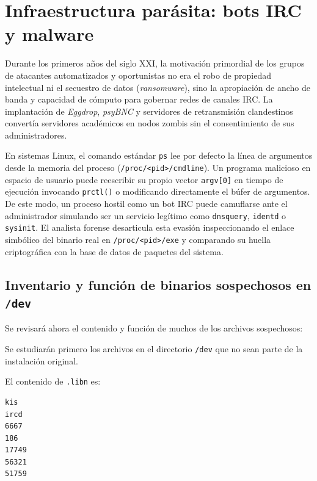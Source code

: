 \chapter{Infraestructura parásita: bots IRC y malware}

Durante los primeros años del siglo XXI, la motivación primordial de los grupos de atacantes automatizados y oportunistas no era el robo de propiedad intelectual ni el secuestro de datos (\textit{ransomware}), sino la apropiación de ancho de banda y capacidad de cómputo para gobernar redes de canales IRC. La implantación de \textit{Eggdrop}, \textit{psyBNC} y servidores de retransmisión clandestinos convertía servidores académicos en nodos zombis sin el consentimiento de sus administradores.

\begin{notaforense}
En sistemas Linux, el comando estándar \texttt{ps} lee por defecto la línea de argumentos desde la memoria del proceso (\texttt{/proc/<pid>/cmdline}). Un programa malicioso en espacio de usuario puede reescribir su propio vector \texttt{argv[0]} en tiempo de ejecución invocando \texttt{prctl()} o modificando directamente el búfer de argumentos. De este modo, un proceso hostil como un bot IRC puede camuflarse ante el administrador simulando ser un servicio legítimo como \texttt{dnsquery}, \texttt{identd} o \texttt{sysinit}. El analista forense desarticula esta evasión inspeccionando el enlace simbólico del binario real en \texttt{/proc/<pid>/exe} y comparando su huella criptográfica con la base de datos de paquetes del sistema.
\end{notaforense}

\section{Inventario y función de binarios sospechosos en \texttt{/dev}}
 
Se revisará ahora el contenido y función de muchos de los archivos
sospechosos:

Se estudiarán primero los archivos en el directorio \texttt{/dev} que no sean
parte de la instalación original.

El contenido de \texttt{.libn} es: 

\vspace{1em}

\begin{lstlisting}[style=terminal]   
kis
ircd
6667
186
17749
56321
51759
\end{lstlisting}

